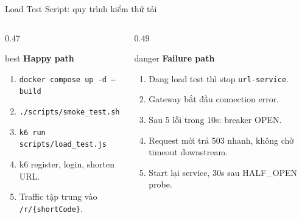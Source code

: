 \documentclass[aspectratio=169]{beamer}
\begin{document}
\begin{frame}{Load Test Script: quy trình kiểm thử tải}
    \begin{columns}[T,onlytextwidth]
        \begin{column}{0.47\textwidth}
            \begin{claimbox}{best}
                \textbf{Happy path}
                \begin{enumerate}\small
                    \item \texttt{docker compose up -d --build}
                    \item \texttt{./scripts/smoke\_test.sh}
                    \item \texttt{k6 run scripts/load\_test.js}
                    \item k6 register, login, shorten URL.
                    \item Traffic tập trung vào \texttt{/r/\{shortCode\}}.
                \end{enumerate}
            \end{claimbox}
        \end{column}
        \begin{column}{0.49\textwidth}
            \begin{claimbox}{danger}
                \textbf{Failure path}
                \begin{enumerate}\small
                    \item Đang load test thì stop \texttt{url-service}.
                    \item Gateway bắt đầu connection error.
                    \item Sau 5 lỗi trong 10s: breaker OPEN.
                    \item Request mới trả 503 nhanh, không chờ timeout downstream.
                    \item Start lại service, 30s sau HALF\_OPEN probe.
                \end{enumerate}
            \end{claimbox}
        \end{column}
    \end{columns}
\end{frame}
\end{document}
